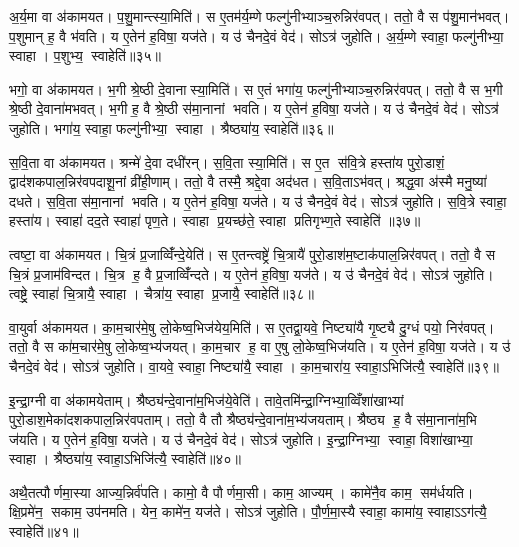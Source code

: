 अ॒र्य॒मा वा अ॑कामयत। प॒शु॒मान्त्स्या॒मिति॑। स ए॒तम॑र्य॒म्णे फल्गु॑नीभ्याञ्च॒रुन्निर॑वपत्। ततो॒ वै स प॑शु॒मान॑भवत्। प॒शुमान् ह॒ वै भ॑वति। य ए॒तेन॑ ह॒विषा॒ यज॑ते। य उ॑ चैनदे॒वं वेद॑। सोऽत्र॑ जुहोति। अ॒र्य॒म्णे स्वाहा॒ फल्गु॑नीभ्या॒ स्वाहा। प॒शुभ्य॒ स्वाहेति॑॥३५॥

भगो॒ वा अ॑कामयत। भ॒गी श्रे॒ष्ठी दे॒वानास्या॒मिति॑। स ए॒तं भगा॑य॒ फल्गु॑नीभ्याञ्च॒रुन्निर॑वपत्। ततो॒ वै स भ॒गी श्रे॒ष्ठी दे॒वाना॑मभवत्। भ॒गी ह॒ वै श्रे॒ष्ठी स॑मा॒नानां भवति। य ए॒तेन॑ ह॒विषा॒ यज॑ते। य उ॑ चैनदे॒वं वेद॑। सोऽत्र॑ जुहोति। भगा॑य॒ स्वाहा॒ फल्गु॑नीभ्या॒ स्वाहा। श्रैष्ठ्या॑य॒ स्वाहेति॑॥३६॥

स॒वि॒ता वा अ॑कामयत। श्रन्मे॑ दे॒वा दधी॑रन्। स॒वि॒ता स्या॒मिति॑। स ए॒त स॑वि॒त्रे हस्ता॑य पुरो॒डाशं॒ द्वाद॑शकपाल॒न्निर॑वपदाशू॒नां व्री॑ही॒णाम्। ततो॒ वै तस्मै॒ श्रद्दे॒वा अद॑धत। स॒वि॒ताऽभ॑वत्। श्रद्ध॒वा अ॑स्मै मनु॒ष्या॑ दधते। स॒वि॒ता स॑मा॒नानां भवति। य ए॒तेन॑ ह॒विषा॒ यज॑ते। य उ॑ चैनदे॒वं वेद॑। सोऽत्र॑ जुहोति। स॒वि॒त्रे स्वाहा॒ हस्ता॑य। स्वाहा॑ दद॒ते स्वाहा॑ पृण॒ते। स्वाहा प्र॒यच्छ॑ते॒ स्वाहा प्रतिगृभ्ण॒ते स्वाहेति॑ ॥३७॥

त्वष्टा॒ वा अ॑कामयत। चि॒त्रं प्र॒जाव्विँ॑न्दे॒येति॑। स ए॒तन्त्वष्ट्रे॑ चि॒त्रायै॑ पुरो॒डाश॑म॒ष्टाक॑पाल॒न्निर॑वपत्। ततो॒ वै स चि॒त्रं प्र॒जाम॑विन्दत। चि॒त्र ह॒ वै प्र॒जाव्विँ॑न्दते। य ए॒तेन॑ ह॒विषा॒ यज॑ते। य उ॑ चैनदे॒वं वेद॑। सोऽत्र॑ जुहोति। त्वष्ट्रे॒ स्वाहा॑ चि॒त्रायै॒ स्वाहा। चैत्रा॑य॒ स्वाहा प्र॒जायै॒ स्वाहेति॑॥३८॥

वा॒युर्वा अ॑कामयत। का॒म॒चार॑मे॒षु लो॒केष्व॒भिज॑येय॒मिति॑। स ए॒तद्वा॒यवे॒ निष्ट्या॑यै गृ॒ष्ट्यै दु॒ग्धं पयो॒ निर॑वपत्। ततो॒ वै स का॑म॒चार॑मे॒षु लो॒केष्व॒भ्य॑जयत्। का॒म॒चार ह॒ वा ए॒षु लो॒केष्व॒भिज॑यति। य ए॒तेन॑ ह॒विषा॒ यज॑ते। य उ॑ चैनदे॒वं वेद॑। सोऽत्र॑ जुहोति। वा॒यवे॒ स्वाहा॒ निष्ट्या॑यै॒ स्वाहा। का॒म॒चारा॑य॒ स्वाहा॒ऽभिजि॑त्यै॒ स्वाहेति॑॥३९॥

इ॒न्द्रा॒ग्नी वा अ॑कामयेताम्। श्रैष्ठ्य॑न्दे॒वाना॑म॒भिज॑ये॒वेति॑। तावे॒तमि॑न्द्रा॒ग्निभ्या॒व्विँशा॑खाभ्यां पुरो॒डाश॒मेका॑दशकपाल॒न्निर॑वपताम्। ततो॒ वै तौ श्रैष्ठ्य॑न्दे॒वाना॑म॒भ्य॑जयताम्। श्रैष्ठ्य ह॒ वै स॑मा॒नाना॑म॒भि ज॑यति। य ए॒तेन॑ ह॒विषा॒ यज॑ते। य उ॑ चैनदे॒वं वेद॑। सोऽत्र॑ जुहोति। इ॒न्द्रा॒ग्निभ्या॒ स्वाहा॒ विशा॑खाभ्या॒ स्वाहा। श्रैष्ठ्या॑य॒ स्वाहा॒ऽभिजि॑त्यै॒ स्वाहेति॑॥४०॥

अथै॒तत्पौर्णमा॒स्या आज्य॒न्निर्व॑पति। कामो॒ वै पौर्णमा॒सी। काम॒ आज्यम्। कामे॑नै॒व काम॒ सम॑र्धयति। क्षि॒प्रमे॑न॒ सकाम॒ उप॑नमति। येन॒ कामे॑न॒ यज॑ते। सोऽत्र॑ जुहोति। पौ॒र्ण॒मा॒स्यै स्वाहा॒ कामा॑य॒ स्वाहाऽऽग॑त्यै॒ स्वाहेति॑॥४१॥\anuvakamend[अ॒ग्निः पञ्च॑दश प्र॒जाप॑ति॒ष्षोड॑श॒ सोम॒ एका॑दश रु॒द्रो दश॒र्क्षैका॑दश॒ बृह॒स्पति॒र्दश॑ देवासु॒रा नव॑ पि॒तर॒ एका॑दशार्य॒मा भगो॒ दश॑ दश सवि॒ता चतु॑र्दश॒ त्वष्टा॑ वा॒युरि॑न्द्रा॒ग्नी दश॑ द॒शाथै॒तत्पौर्णमा॒स्या अ॒ष्टौ पञ्च॑दश]

